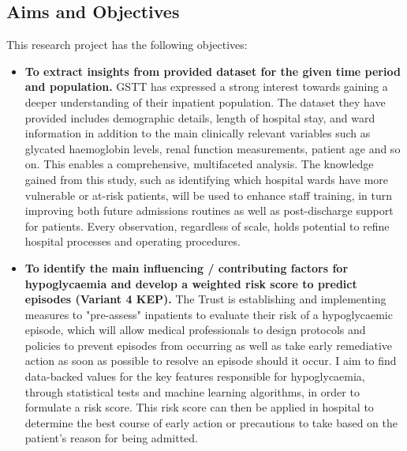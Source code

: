 \subsection{Aims and Objectives} 
This research project has the following objectives:

\begin{itemize}
	\item \textbf{To extract insights from provided dataset for the given time period and population.} GSTT has expressed a strong interest towards gaining a deeper understanding of their inpatient population. The dataset they have provided includes demographic details, length of hospital stay, and ward information in addition to the main clinically relevant variables such as glycated haemoglobin levels, renal function measurements, patient age and so on. This enables a comprehensive, multifaceted analysis. The knowledge gained from this study, such as identifying which hospital wards have more vulnerable or at-risk patients, will be used to enhance staff training, in turn improving both future admissions routines as well as post-discharge support for patients. Every observation, regardless of scale, holds potential to refine hospital processes and operating procedures.
	\item \textbf{To identify the main influencing / contributing factors for hypoglycaemia and develop a weighted risk score to predict episodes (Variant 4 KEP).} The Trust is establishing and implementing measures to "pre-assess" inpatients to evaluate their risk of a hypoglycaemic episode, which will allow medical professionals to design protocols and policies to prevent episodes from occurring as well as take early remediative action as soon as possible to resolve an episode should it occur. I aim to find data-backed values for the key features responsible for hypoglycaemia, through statistical tests and machine learning algorithms, in order to formulate a risk score. This risk score can then be applied in hospital to determine the best course of early action or precautions to take based on the patient's reason for being admitted.
\end{itemize}


